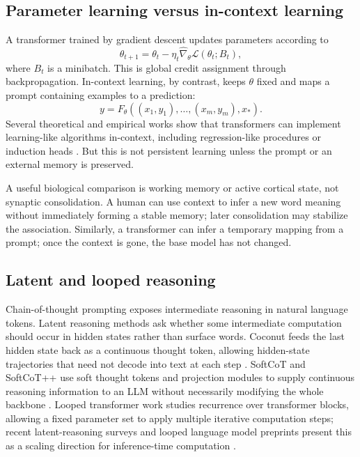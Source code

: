 \documentclass[11pt]{article}
\newcommand{\1}{\mathbf{1}}
\begin{document}
\subsection{Parameter learning versus in-context learning}

A transformer trained by gradient descent updates parameters according to
\[
\theta_{t+1}=\theta_t-\eta_t \widehat\nabla_\theta \mathcal{L}(\theta_t;B_t),
\]
where $B_t$ is a minibatch. This is global credit assignment through backpropagation. In-context learning, by contrast, keeps $\theta$ fixed and maps a prompt containing examples to a prediction:
\[
y=F_\theta((x_1,y_1),\dots,(x_m,y_m),x_*) .
\]
Several theoretical and empirical works show that transformers can implement learning-like algorithms in-context, including regression-like procedures or induction heads \cite{Olsson2022,Akyurek2023,VonOswald2023,Garg2022,Smart2025}. But this is not persistent learning unless the prompt or an external memory is preserved.

A useful biological comparison is working memory or active cortical state, not synaptic consolidation. A human can use context to infer a new word meaning without immediately forming a stable memory; later consolidation may stabilize the association. Similarly, a transformer can infer a temporary mapping from a prompt; once the context is gone, the base model has not changed.

\subsection{Latent and looped reasoning}

Chain-of-thought prompting exposes intermediate reasoning in natural language tokens. Latent reasoning methods ask whether some intermediate computation should occur in hidden states rather than surface words. Coconut feeds the last hidden state back as a continuous thought token, allowing hidden-state trajectories that need not decode into text at each step \cite{Hao2024}. SoftCoT and SoftCoT++ use soft thought tokens and projection modules to supply continuous reasoning information to an LLM without necessarily modifying the whole backbone \cite{SoftCoT2025,SoftCoTPlus2025}. Looped transformer work studies recurrence over transformer blocks, allowing a fixed parameter set to apply multiple iterative computation steps; recent latent-reasoning surveys and looped language model preprints present this as a scaling direction for inference-time computation \cite{YangLooped2024,Saunshi2025,ZhuLatentSurvey2025,ZhuOuro2025}.
\end{document}
